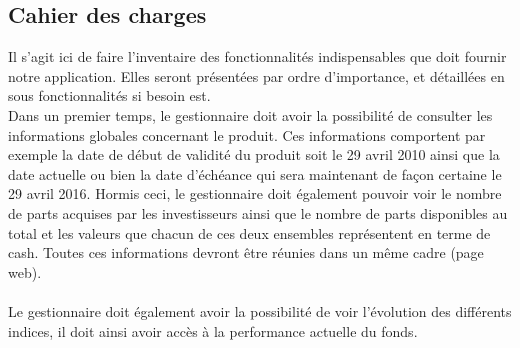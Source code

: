 \documentclass[french,12pt,a4paper]{article}
\begin{document}
\subsection{Cahier des charges}
Il s'agit ici de faire l'inventaire des fonctionnalités indispensables que doit fournir notre application. Elles seront présentées par ordre d'importance, et détaillées en sous fonctionnalités si besoin est.
\\
\indent Dans un premier temps, le gestionnaire doit avoir la possibilité de consulter les informations globales concernant le produit. Ces informations comportent par exemple la date de début de validité du produit soit le 29 avril  2010 ainsi que la date actuelle ou bien la date d'échéance qui sera maintenant de façon certaine le 29 avril 2016. Hormis ceci, le gestionnaire doit également pouvoir voir le nombre de parts acquises par les investisseurs ainsi que le nombre de parts disponibles au total et les valeurs que chacun de ces deux ensembles représentent en terme de cash. Toutes ces informations devront être réunies dans un même cadre (page web).\\
\indent \\
\indent Le gestionnaire doit également avoir la possibilité de voir l'évolution des différents indices, il doit ainsi avoir accès à la performance actuelle du fonds.
\end{document}
